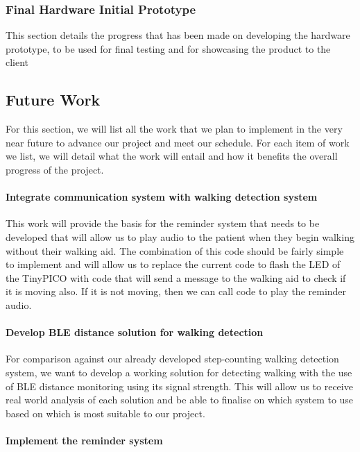 {\subsubsection{Final Hardware Initial Prototype}

This section details the progress that has been made on developing the hardware prototype, to be used for final testing and for showcasing the product to the client


\subsection{Future Work}\label{sec:Future work}

For this section, we will list all the work that we plan to implement in the very near future to advance our project and meet our schedule. For each item of work we list, we will detail what the work will entail and how it benefits the overall progress of the project.

\paragraph{Integrate communication system with walking detection system}

This work will provide the basis for the reminder system that needs to be developed that will allow us to play audio to the patient when they begin walking without their walking aid. The combination of this code should be fairly simple to implement and will allow us to replace the current code to flash the LED of the TinyPICO with code that will send a message to the walking aid to check if it is moving also. If it is not moving, then we can call code to play the reminder audio.

\paragraph{Develop BLE distance solution for walking detection}

For comparison against our already developed step-counting walking detection system, we want to develop a working solution for detecting walking with the use of BLE distance monitoring using its signal strength. This will allow us to receive real world analysis of each solution and be able to finalise on which system to use based on which is most suitable to our project.

\paragraph{Implement the reminder system}

}
